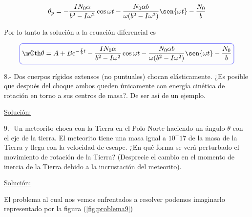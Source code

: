 \documentclass[a4paper,10pt]{article}
\makeatletter
\numberwithin{equation}{section}
\newcommand*{\boxcolor}{blue}
\renewcommand{\boxed}[1]{\textcolor{\boxcolor}{%
\tikz[baseline={([yshift=-1ex]current bounding box.center)}] \node [rectangle, minimum width=1ex,rounded corners,draw] {\normalcolor\m@th$\displaystyle#1$};}}
\newcommand{\euler}{\mathrm{e}}
\makeatother
\begin{document}
\begin{equation}
 \theta_p = - \frac{IN_0 \alpha}{b^2-I\omega^2} \cos{\omega t} 
 - \frac{N_0 \alpha b}{\omega(b^2-I\omega^2)} \sen{\omega t} - \frac{N_0}{b}
\end{equation}


Por lo tanto la solución a la ecuación diferencial es

\begin{equation}
 \boxed{\theta = A + B \euler^{-\frac{I}{b}t} - \frac{IN_0 \alpha}{b^2-I\omega^2} \cos{\omega t} 
 - \frac{N_0 \alpha b}{\omega(b^2-I\omega^2)} \sen{\omega t} - \frac{N_0}{b}}
\end{equation}

\vspace{.3cm}

8.- Dos cuerpos rígidos extensos (no puntuales) chocan elásticamente. ¿Es posible que 
después del choque ambos queden únicamente con energía cinética de rotación en torno 
a sus centros de masa?. De ser así de un ejemplo.
\vspace{.3cm}

\underline{Solución:}

\vspace{.3cm}

9.- Un meteorito choca con la Tierra en el Polo Norte haciendo un ángulo $\theta$ con
el eje de la tierra. El meteorito tiene una masa igual a $10^-17$ de la masa de la 
Tierra y llega con la velocidad de escape. ¿En qué forma se verá perturbado el movimiento
de rotación de la Tierra? (Desprecie el cambio en el momento de inercia de la Tierra
debido a la incrustación del meteorito).
\vspace{.3cm}

\underline{Solución:}\vspace{.3cm}

El problema al cual nos vemos enfrentados a resolver podemos imaginarlo representado
por la figura (\ref{fig:problema9})
\end{document}
